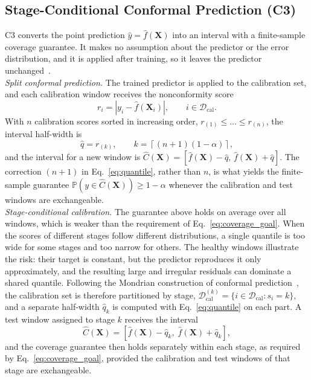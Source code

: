 \subsection{Stage-Conditional Conformal Prediction (C3)}
\label{sec:c3_conformal}

C3 converts the point prediction $\hat{y} = \hat{f}(\mathbf{X})$ into
an interval with a finite-sample coverage guarantee. It makes no
assumption about the predictor or the error distribution, and it is
applied after training, so it leaves the predictor
unchanged~\cite{lei2018distribution, angelopoulos2023gentle}.\\

\textit{Split conformal prediction.} The trained predictor is applied
to the calibration set, and each calibration window receives the
nonconformity score
\begin{equation}
  r_i = \left| y_i - \hat{f}(\mathbf{X}_i) \right|,
  \qquad i \in \mathcal{D}_{\mathrm{cal}} .
  \label{eq:score}
\end{equation}
With $n$ calibration scores sorted in increasing order,
$r_{(1)} \leq \dots \leq r_{(n)}$, the interval half-width is
\begin{equation}
  \hat{q} = r_{(k)}, \qquad
  k = \left\lceil (n+1)(1-\alpha) \right\rceil ,
  \label{eq:quantile}
\end{equation}
and the interval for a new window is
$\hat{C}(\mathbf{X}) = [\hat{f}(\mathbf{X}) - \hat{q},\,
\hat{f}(\mathbf{X}) + \hat{q}]$. The correction $(n+1)$ in
Eq.~\eqref{eq:quantile}, rather than $n$, is what yields the
finite-sample guarantee
$\mathbb{P}(y \in \hat{C}(\mathbf{X})) \geq 1 - \alpha$ whenever the
calibration and test windows are exchangeable.\\

\textit{Stage-conditional calibration.} The guarantee above holds on
average over all windows, which is weaker than the requirement of
Eq.~\eqref{eq:coverage_goal}. When the scores of different stages
follow different distributions, a single quantile is too wide for some
stages and too narrow for others. The healthy windows illustrate the
risk: their target is constant, but the predictor reproduces it only
approximately, and the resulting large and irregular residuals can
dominate a shared quantile. Following the Mondrian construction of
conformal prediction~\cite{vovk2005algorithmic}, the calibration set is
therefore partitioned by
stage, $\mathcal{D}_{\mathrm{cal}}^{(k)} = \{ i \in
\mathcal{D}_{\mathrm{cal}} : s_i = k \}$, and a separate half-width
$\hat{q}_k$ is computed with Eq.~\eqref{eq:quantile} on each part. A
test window assigned to stage $k$ receives the interval
\begin{equation}
  \hat{C}(\mathbf{X}) = \left[ \hat{f}(\mathbf{X}) - \hat{q}_{k},\;
  \hat{f}(\mathbf{X}) + \hat{q}_{k} \right],
  \label{eq:mondrian_interval}
\end{equation}
and the coverage guarantee then holds separately within each stage, as
required by Eq.~\eqref{eq:coverage_goal}, provided the calibration and
test windows of that stage are exchangeable.\\

